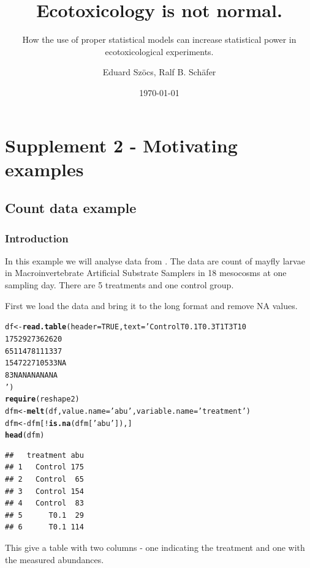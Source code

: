 \documentclass{scrartcl}\usepackage[]{graphicx}\usepackage[]{color}
\title{Ecotoxicology is not normal.}
\subtitle{How the use of proper statistical models can increase statistical power in ecotoxicological experiments.}
\author{Eduard Szöcs, Ralf B. Schäfer}
\date{\today}
\makeatletter
\newcommand{\hlnum}[1]{\textcolor[rgb]{0.686,0.059,0.569}{#1}}%
\newcommand{\hlstr}[1]{\textcolor[rgb]{0.192,0.494,0.8}{#1}}%
\newcommand{\hlopt}[1]{\textcolor[rgb]{0,0,0}{#1}}%
\newcommand{\hlstd}[1]{\textcolor[rgb]{0.345,0.345,0.345}{#1}}%
\newcommand{\hlkwb}[1]{\textcolor[rgb]{0.69,0.353,0.396}{#1}}%
\newcommand{\hlkwc}[1]{\textcolor[rgb]{0.333,0.667,0.333}{#1}}%
\newcommand{\hlkwd}[1]{\textcolor[rgb]{0.737,0.353,0.396}{\textbf{#1}}}%
\newenvironment{kframe}{%
 \def\at@end@of@kframe{}%
 \ifinner\ifhmode%
  \def\at@end@of@kframe{\end{minipage}}%
  \begin{minipage}{\columnwidth}%
 \fi\fi%
 \def\FrameCommand##1{\hskip\@totalleftmargin \hskip-\fboxsep
 \colorbox{shadecolor}{##1}\hskip-\fboxsep
     \hskip-\linewidth \hskip-\@totalleftmargin \hskip\columnwidth}%
 \MakeFramed {\advance\hsize-\width
   \@totalleftmargin\z@ \linewidth\hsize
   \@setminipage}}%
 {\par\unskip\endMakeFramed%
 \at@end@of@kframe}
\newenvironment{knitrout}{}{} %
\makeatother
\begin{document}
\maketitle

\setcounter{section}{1}
\section{Supplement 2 - Motivating examples}
\subsection{Count data example}
\subsubsection{Introduction}
In this example we will analyse data from \citep{brock_minimum_2015}.
The data are count of mayfly larvae in Macroinvertebrate Artificial Substrate Samplers in 18 mesocosms at one sampling day.
There are 5 treatments and one control group.

First we load the data and bring it to the long format and remove NA values.
\begin{knitrout}
\color{fgcolor}\begin{kframe}
\begin{alltt}
\hlstd{df} \hlkwb{<-} \hlkwd{read.table}\hlstd{(}\hlkwc{header} \hlstd{=} \hlnum{TRUE}\hlstd{,} \hlkwc{text} \hlstd{=} \hlstr{'Control  T0.1 T0.3  T1  T3  T10
175 29  27  36  26  20
65  114 78  11  13  37
154 72  27  105 33  NA
83  NA  NA  NA  NA  NA
'}\hlstd{)}
\hlkwd{require}\hlstd{(reshape2)}
\hlstd{dfm} \hlkwb{<-} \hlkwd{melt}\hlstd{(df,} \hlkwc{value.name} \hlstd{=} \hlstr{'abu'}\hlstd{,} \hlkwc{variable.name} \hlstd{=} \hlstr{'treatment'}\hlstd{)}
\hlstd{dfm} \hlkwb{<-} \hlstd{dfm[}\hlopt{!}\hlkwd{is.na}\hlstd{(dfm[}\hlstr{'abu'}\hlstd{]), ]}
\hlkwd{head}\hlstd{(dfm)}
\end{alltt}
\begin{verbatim}
##   treatment abu
## 1   Control 175
## 2   Control  65
## 3   Control 154
## 4   Control  83
## 5      T0.1  29
## 6      T0.1 114
\end{verbatim}
\end{kframe}
\end{knitrout}
This give a table with two columns - one indicating the treatment and one with the measured abundances.
\end{document}
